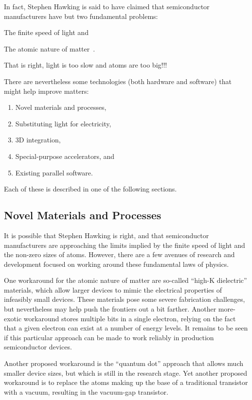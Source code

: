 In fact, Stephen Hawking is said to have claimed that semiconductor
manufacturers have but two fundamental problems:
\begin{enumerate*}[(1)]
\item The finite speed of light and
\item The atomic nature of matter~\cite{BryanGardiner2007}.
\end{enumerate*}
That is right, light is too slow and atoms are too big!!!

There are nevertheless some technologies (both hardware and software)
that might help improve matters:

\begin{enumerate}
\item	Novel materials and processes,
\item	Substituting light for electricity,
\item	3D integration,
\item	Special-purpose accelerators, and
\item	Existing parallel software.
\end{enumerate}

Each of these is described in one of the following sections.

\subsection{Novel Materials and Processes}
\label{sec:cpu:Novel Materials and Processes}

It is possible that Stephen Hawking is right, and that semiconductor
manufacturers are approaching the limits implied by the finite speed of
light and the non-zero sizes of atoms.
However, there are a few avenues of research and development focused on
working around these fundamental laws of physics.

One workaround for the atomic nature of matter are so-called
``high-K dielectric'' materials, which allow larger devices to mimic the
electrical properties of infeasibly small devices.
These materials pose some severe fabrication challenges, but nevertheless
may help push the frontiers out a bit farther.
Another more-exotic workaround stores multiple bits in a single electron,
relying on the fact that a given electron can exist at a number of
energy levels.
It remains to be seen if this particular approach can be made to work
reliably in production semiconductor devices.

Another proposed workaround is the ``quantum dot'' approach that
allows much smaller device sizes, but which is still in the research
stage.
Yet another proposed workaround is to replace the atoms making up the
base of a traditional transistor with a vacuum, resulting in the
vacuum-gap transistor.

